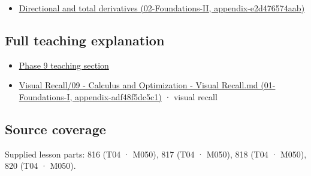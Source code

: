 \begin{itemize}
\tightlist
\item
  \href{}{Directional and total derivatives (02-Foundations-II, appendix-e2d476574aab)}
\end{itemize}

\subsection{Full teaching explanation}\label{full-teaching-explanation}

\begin{itemize}
\tightlist
\item
  \href{Continuous\%20Notes/Computing\%20Foundations\%20-\%20From\%20Bits\%20to\%20C++\%20and\%20Systems\%20APIs\#Multivariable\%20derivatives\%20and\%20sensitivity}{Phase 9 teaching section}
\item
  \href{}{Visual Recall/09 - Calculus and Optimization - Visual Recall.md (01-Foundations-I, appendix-adf48f5dc5c1)} · visual recall
\end{itemize}

\subsection{Source coverage}\label{source-coverage}

Supplied lesson parts: 816 (T04 · M050), 817 (T04 · M050), 818 (T04 · M050), 820 (T04 · M050).
